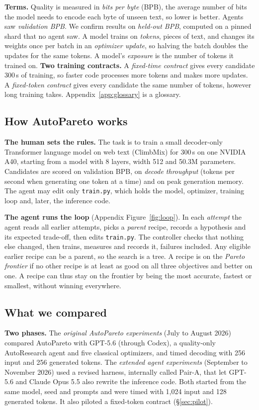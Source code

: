 \documentclass{article}
\begin{document}
 \textbf{Terms.} Quality is measured in \emph{bits per byte} (BPB), the average number of bits the model needs to encode each byte of unseen text, so lower is better. Agents saw \emph{validation BPB}. We confirm results on \emph{held-out BPB}, computed on a pinned shard that no agent saw. A model trains on \emph{tokens}, pieces of text, and changes its weights once per batch in an \emph{optimizer update}, so halving the batch doubles the updates for the same tokens. A model's \emph{exposure} is the number of tokens it trained on. \textbf{Two training contracts.} A \emph{fixed-time contract} gives every candidate 300\,s of training, so faster code processes more tokens and makes more updates. A \emph{fixed-token contract} gives every candidate the same number of tokens, however long training takes. Appendix~\ref{app:glossary} is a glossary.

\subsection{How AutoPareto works}\label{sec:brief}
 \textbf{The human sets the rules.} The task is to train a small decoder-only Transformer language model on web text (ClimbMix) for 300\,s on one NVIDIA A40, starting from a model with 8 layers, width 512 and 50.3M parameters. Candidates are scored on validation BPB, on \emph{decode throughput} (tokens per second when generating one token at a time) and on peak generation memory. The agent may edit only \texttt{train.py}, which holds the model, optimizer, training loop and, later, the inference code.

 \textbf{The agent runs the loop} (Appendix Figure~\ref{fig:loop}). In each \emph{attempt} the agent reads all earlier attempts, picks a \emph{parent} recipe, records a hypothesis and its expected trade-off, then edits \texttt{train.py}. The controller checks that nothing else changed, then trains, measures and records it, failures included. Any eligible earlier recipe can be a parent, so the search is a tree. A recipe is on the \emph{Pareto frontier} if no other recipe is at least as good on all three objectives and better on one. A recipe can thus stay on the frontier by being the most accurate, fastest or smallest, without winning everywhere.

\subsection{What we compared}\label{sec:compare}
 \textbf{Two phases.} The \emph{original AutoPareto experiments} (July to August 2026) compared AutoPareto with GPT-5.6 (through Codex), a quality-only AutoResearch agent and five classical optimizers, and timed decoding with 256 input and 256 generated tokens. The \emph{extended agent experiments} (September to November 2026) used a revised harness, internally called Pair-A, that let GPT-5.6 and Claude Opus 5.5 also rewrite the inference code. Both started from the same model, seed and prompts and were timed with 1{,}024 input and 128 generated tokens. It also piloted a fixed-token contract (\S\ref{sec:pilot}).
\end{document}
